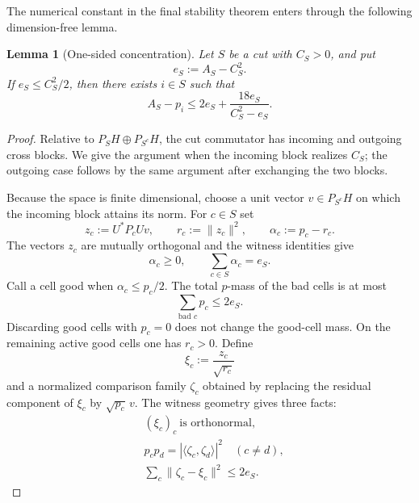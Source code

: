 \documentclass[11pt]{article}
\newtheorem{lemma}[theorem]{Lemma}
\begin{document}
The numerical constant in the final stability theorem enters through the
following dimension-free lemma.

\begin{lemma}[One-sided concentration]\label{lem:onesided}
Let $S$ be a cut with $C_S>0$, and put
\[
  e_S:=A_S-C_S^2.
\]
If $e_S\le C_S^2/2$, then there exists $i\in S$ such that
\begin{equation}\label{eq:onesided}
  A_S-p_i
  \le
  2e_S+\frac{18e_S}{C_S^2-e_S}.
\end{equation}
\end{lemma}

\begin{proof}
Relative to $P_SH\oplus P_{S^c}H$, the cut commutator has incoming and
outgoing cross blocks.  We give the argument when the incoming block realizes
$C_S$; the outgoing case follows by the same argument after exchanging the
two blocks.

Because the space is finite dimensional, choose a unit vector
$v\in P_{S^c}H$ on which the incoming block attains its norm.  For $c\in S$
set
\[
  z_c:=U^*P_cUv,\qquad
  r_c:=\|z_c\|^2,\qquad
  \alpha_c:=p_c-r_c.
\]
The vectors $z_c$ are mutually orthogonal and the witness identities give
\begin{equation}\label{eq:witness-defect}
  \alpha_c\ge0,\qquad
  \sum_{c\in S}\alpha_c=e_S.
\end{equation}
Call a cell good when $\alpha_c\le p_c/2$.  The total $p$-mass of the bad
cells is at most
\begin{equation}\label{eq:badmass}
  \sum_{\text{bad }c}p_c\le2e_S.
\end{equation}
Discarding good cells with $p_c=0$ does not change the good-cell mass.  On
the remaining active good cells one has $r_c>0$.  Define
\[
  \xi_c:=\frac{z_c}{\sqrt{r_c}}
\]
and a normalized comparison family $\zeta_c$ obtained by replacing the
residual component of $\xi_c$ by $\sqrt{p_c}\,v$.  The witness geometry gives
three facts:
\begin{align}
  &(\xi_c)_c\ \text{is orthonormal}, \label{eq:xi-orth}\\
  &p_cp_d=|\langle\zeta_c,\zeta_d\rangle|^2
      \quad(c\ne d), \label{eq:zeta-gram}\\
  &\sum_c\|\zeta_c-\xi_c\|^2\le2e_S. \label{eq:gram-close}
\end{align}


\end{proof}
\end{document}
